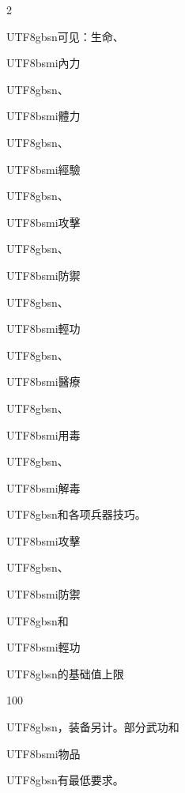 \begin{paracol}{2}
\begin{CJK}{UTF8}{gbsn}可见：生命、\end{CJK}\begin{CJK}{UTF8}{bsmi}內力\end{CJK}\begin{CJK}{UTF8}{gbsn}、\end{CJK}\begin{CJK}{UTF8}{bsmi}體力\end{CJK}\begin{CJK}{UTF8}{gbsn}、\end{CJK}\begin{CJK}{UTF8}{bsmi}經驗\end{CJK}\begin{CJK}{UTF8}{gbsn}、\end{CJK}\begin{CJK}{UTF8}{bsmi}攻擊\end{CJK}\begin{CJK}{UTF8}{gbsn}、\end{CJK}\begin{CJK}{UTF8}{bsmi}防禦\end{CJK}\begin{CJK}{UTF8}{gbsn}、\end{CJK}\begin{CJK}{UTF8}{bsmi}輕功\end{CJK}\begin{CJK}{UTF8}{gbsn}、\end{CJK}\begin{CJK}{UTF8}{bsmi}醫療\end{CJK}\begin{CJK}{UTF8}{gbsn}、\end{CJK}\begin{CJK}{UTF8}{bsmi}用毒\end{CJK}\begin{CJK}{UTF8}{gbsn}、\end{CJK}\begin{CJK}{UTF8}{bsmi}解毒\end{CJK}\begin{CJK}{UTF8}{gbsn}和各项兵器技巧。\end{CJK}\begin{CJK}{UTF8}{bsmi}攻擊\end{CJK}\begin{CJK}{UTF8}{gbsn}、\end{CJK}\begin{CJK}{UTF8}{bsmi}防禦\end{CJK}\begin{CJK}{UTF8}{gbsn}和\end{CJK}\begin{CJK}{UTF8}{bsmi}輕功\end{CJK}\begin{CJK}{UTF8}{gbsn}的基础值上限\end{CJK} 100\begin{CJK}{UTF8}{gbsn}，装备另计。部分武功和\end{CJK}\begin{CJK}{UTF8}{bsmi}物品\end{CJK}\begin{CJK}{UTF8}{gbsn}有最低要求。\end{CJK}\par

\end{paracol}
